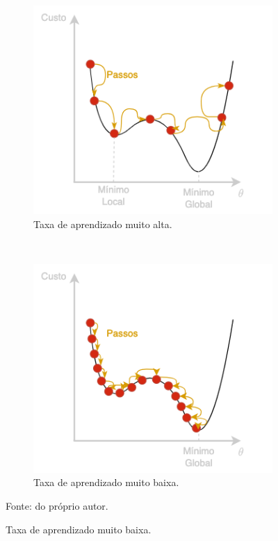 \begin{figure}[H]
    \centering
    \caption[Atualização da taxa de aprendizado.]{Representação de atualização da taxa de aprendizado.}
    \label{deep:fig:dynamic_lr}
    \begin{subfigure}[t]{0.45\textwidth}
        \centering
        \includegraphics[width=1\linewidth]{recursos/imagens/deep/lr_high.png}
        \caption{Taxa de aprendizado muito alta.}
        \label{deep:fig:dynamic_lr.1}
    \end{subfigure}%
    ~ 
    \begin{subfigure}[t]{0.45\textwidth}
        \centering
        \includegraphics[width=1\linewidth]{recursos/imagens/deep/lr_low.png}
        \caption{Taxa de aprendizado muito baixa.}
        \label{deep:fig:dynamic_lr.2}
    \end{subfigure}

    Fonte: do próprio autor.
\end{figure}


